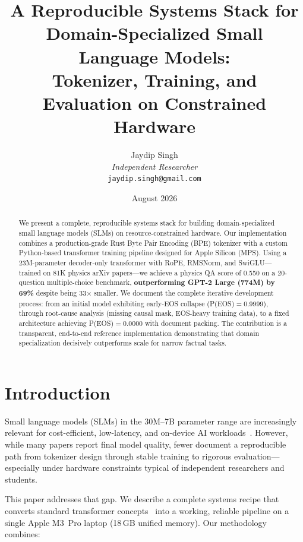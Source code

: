\documentclass[11pt]{article}
\title{A Reproducible Systems Stack for Domain-Specialized Small Language Models:\\
Tokenizer, Training, and Evaluation on Constrained Hardware}
\author{
  Jaydip Singh\\
  \textit{Independent Researcher}\\
  \texttt{jaydip.singh@gmail.com}
}
\date{August 2026}
\begin{document}
\maketitle

\begin{abstract}
We present a complete, reproducible systems stack for building domain-specialized small language models (SLMs) on resource-constrained hardware. Our implementation combines a production-grade Rust Byte Pair Encoding (BPE) tokenizer with a custom Python-based transformer training pipeline designed for Apple Silicon (MPS). Using a 23M-parameter decoder-only transformer with RoPE, RMSNorm, and SwiGLU---trained on 81K physics arXiv papers---we achieve a physics QA score of 0.550 on a 20-question multiple-choice benchmark, \textbf{outperforming GPT-2 Large (774M) by 69\%} despite being 33$\times$ smaller. We document the complete iterative development process: from an initial model exhibiting early-EOS collapse (P(EOS)$=$0.9999), through root-cause analysis (missing causal mask, EOS-heavy training data), to a fixed architecture achieving P(EOS)$=$0.0000 with document packing. The contribution is a transparent, end-to-end reference implementation demonstrating that domain specialization decisively outperforms scale for narrow factual tasks.
\end{abstract}

\section{Introduction}
\label{sec:intro}

Small language models (SLMs) in the 30M--7B parameter range are increasingly relevant for cost-efficient, low-latency, and on-device AI workloads~\cite{sharma2025survey, elfeki2025encoder}. However, while many papers report final model quality, fewer document a reproducible path from tokenizer design through stable training to rigorous evaluation---especially under hardware constraints typical of independent researchers and students.

This paper addresses that gap. We describe a complete systems recipe that converts standard transformer concepts~\cite{vaswani2017attention} into a working, reliable pipeline on a single Apple M3~Pro laptop (18\,GB unified memory). Our methodology combines:
\end{document}
